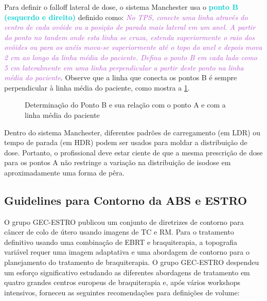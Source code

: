 \documentclass[11pt,a4paper]{article}
\begin{document}
	Para definir o falloff lateral de dose, o sistema Manchester usa o \textcolor{DarkTurquoise}{\textbf{ponto B (esquerdo e direito)}} definido como: \textcolor{MediumOrchid}{\textit{No TPS, conecte uma linha através do centro de cada ovóide ou a posição de parada mais lateral em um anel. A partir do ponto no tandem onde esta linha se cruza, estenda superiormente o raio dos ovóides ou para os anéis mova-se superiormente até o topo do anel e depois mova 2 cm ao longo da linha média do paciente. Defina o ponto B em cada lado como 5 cm lateralmente em uma linha perpendicular a partir deste ponto na linha média do paciente}}. Observe que a linha que conecta os pontos B é sempre perpendicular à linha média do paciente, como mostra a \ref{fig:pontoB}.

	\begin{figure}[h]
		\centering
		\caption{Determinação do Ponto B e sua relação com o ponto A e com a linha média do paciente}
		\label{fig:pontoB}
	\end{figure}

	Dentro do sistema Manchester, diferentes padrões de carregamento (em LDR) ou tempo de parada (em HDR) podem ser usados para moldar a distribuição de dose. Portanto, o profissional deve estar ciente de que a mesma prescrição de dose para os pontos A não restringe a variação na distribuição de isodose em aproximadamente uma forma de pêra.

\subsection*{Guidelines para Contorno da ABS e ESTRO}

	O grupo GEC-ESTRO publicou um conjunto de diretrizes de contorno para câncer de colo de útero usando imagens de TC e RM. Para o tratamento definitivo usando uma combinação de EBRT e braquiterapia, a topografia variável requer uma imagem adaptativa e uma abordagem de contorno para o planejamento do tratamento de braquiterapia. O grupo GEC-ESTRO despendeu um esforço significativo estudando as diferentes abordagens de tratamento em quatro grandes centros europeus de braquiterapia e, após vários workshops intensivos, forneceu as seguintes recomendações para definições de volume:
\end{document}
